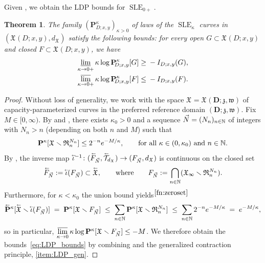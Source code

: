 \documentclass[a4paper, 11pt]{article}
\newtheorem{thm}{Theorem}[section]
\theoremstyle{definition}
\numberwithin{equation}{section}
\numberwithin{figure}{section}
\renewcommand{\liminf}{\varliminf}
\renewcommand{\limsup}{\varlimsup}
\newcommand{\SLE}[1][]{\operatorname{SLE}_{#1}}
\newcommand{\lenergy}[2]{I_{#1;#2}}
\newcommand{\cev}[1]{\accentset{\leftarrow}{#1}}
\newcommand{\limembedding}{\smash{\cev\iota}}
\newcommand{\Xpaths}[1][]{\mathfrak{X}_{#1}}
\newcommand{\limXpaths}{\smash{\cev{\Xpaths}}}
\newcommand{\dXpaths}[1][]{d_{\Xpaths[#1]}}
\newcommand{\Ddomain}{\mathbf{D}}
\newcommand{\targetpoint}{\mathfrak{w}}
\newcommand{\beginpoint}{\mathfrak{z}}
\newcommand{\SLEmeasure}[2]{\mathbf{P}^{#2}_{\!\!#1}}
\newcommand{\limXmeasure}[1]{\smash{\cev{\mathbf P}^{#1}}}
\newcommand{\xreturnevent}[2]{\mathfrak{R}_{#1}^{#2}}
\newcommand{\Eset}{F}
\begin{document}
Given , we obtain the LDP bounds for $\SLE[0+]$. 

\begin{thm}\label{thm:radial-LDP-bounds}
The family $(\SLEmeasure{D;x,y}{\kappa})_{\kappa > 0}$ of laws of the $\SLE[\kappa]$ curves 
in $(\Xpaths(D;x,y),\dXpaths)$ satisfy the following bounds:
for every open $G \subset \Xpaths(D;x,y)$ and closed $F \subset \Xpaths(D;x,y)$, we have
\begin{align}\label{eq:LDP_bounds}
\begin{split}
\liminf_{\kappa \to 0+}\kappa\log\SLEmeasure{D;x,y}{\kappa}[G] \ge\;& 
-\lenergy{D}{x,y}(G) , \\
\limsup_{\kappa \to 0+}\kappa\log\SLEmeasure{D;x,y}{\kappa}[F] \le\;& 
-\lenergy{D}{x,y}(F).
\end{split}
\end{align}
\end{thm}

\begin{proof}
Without loss of generality, we work with the space 
$\Xpaths = \Xpaths(\Ddomain;\beginpoint,\targetpoint)$ of capacity-parameterized curves in the preferred reference domain $(\Ddomain;\beginpoint,\targetpoint)$. 
Fix $M \in [0,\infty)$. 
By  and , there exists $\kappa_0 > 0$ 
and a sequence $\vec N = (N_n)_{n \in \mathbb{N}}$ of integers with $N_n > n$ (depending on both $n$ and $M$) such that 
\begin{align*}
\SLEmeasure{}{\kappa}[\Xpaths \smallsetminus \xreturnevent{n}{N_n}] \le 2^{-n}e^{-M/\kappa}, \qquad 
\textnormal{for all } \kappa \in (0, \kappa_0) \textnormal{ and } n \in \bN.
\end{align*}
By , the inverse map $\limembedding^{-1} \colon (\cev \Eset_{\vec N}, \smash{\cev \cT_{\dXpaths}}) \to (\Eset_{\vec N}, \dXpaths)$ is continuous on the closed set
\begin{align*}
\cev \Eset_{\vec N} := \limembedding (\Eset_{\vec N}) \subset \limXpaths , \qquad 
\textnormal{where}
\qquad \Eset_{\vec N} := \bigcap_{n \in \bN} (\Xpaths[\infty] \smallsetminus \xreturnevent{n}{N_n}) .
\end{align*}
Furthermore, 
for $\kappa < \kappa_0$ 
the union bound yields${}^{\ref{fn:zeroset}}$
\begin{align*}
\limXmeasure{\kappa}[\limXpaths \smallsetminus \limembedding(\Eset_{\vec N})]
\; = \; \SLEmeasure{}{\kappa}[\Xpaths \smallsetminus \Eset_{\vec N}]
\; \le \; \sum_{n \in \bN} \SLEmeasure{}{\kappa}[\Xpaths \smallsetminus \xreturnevent{n}{N_n}]
\; \le \; \sum_{n \in \bN} 2^{-n} e^{-M/\kappa}
\; = \; e^{-M/\kappa},
\end{align*}
so in particular, $\underset{\kappa \to 0}{\limsup} \, \kappa\log\SLEmeasure{}{\kappa}[\Xpaths \smallsetminus \Eset_{\vec N}] \le -M$.
We therefore obtain the bounds~\eqref{eq:LDP_bounds} 
by combining 
 and the
generalized contraction principle, 
\ref{item:LDP_gen}.  
\end{proof}
\end{document}
